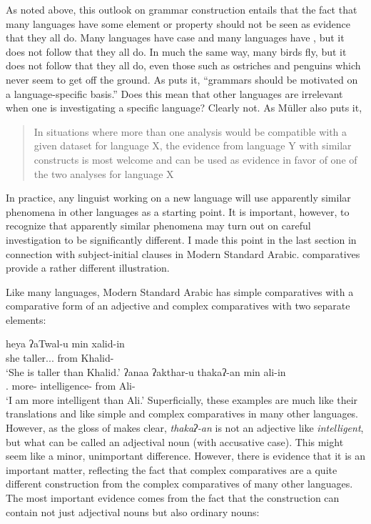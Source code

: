 \documentclass[output=paper]{langsci/langscibook}
\begin{document}
As noted above, this outlook on grammar construction entails that the fact that
many languages have some element or property should not be seen as evidence
that they all do. Many languages have case and many languages have
, but it does not follow that they all do. In much the same way,
many birds fly, but it does not follow that they all do, even those such as
ostriches and penguins which never seem to get off the ground. As
\citet[25]{Muller2015} puts it, \enquote{grammars should be motivated on a
    language-specific basis.} Does this mean that other languages are
    irrelevant when one is investigating a specific language?  Clearly not. As
    Müller also puts it, \blockquote[{\citealt[43]{Muller2015}}][.]{In
        situations where more than one analysis would be compatible with a
    given dataset for language X, the evidence from language Y with similar
constructs is most welcome and can be used as evidence in favor of one of the
two analyses for language X} In practice, any linguist working on a new
language will use apparently similar phenomena in other languages as a starting
point. It is important, however, to recognize that apparently similar phenomena
may turn out on careful investigation to be significantly different. I made
this point in the last section in connection with subject-initial clauses in
Modern Standard Arabic.   comparatives provide a rather different
illustration.

Like many languages, Modern Standard Arabic has simple comparatives with a comparative form of an
adjective and complex comparatives with two separate elements:

\newpage

\ea\label{ex:key:4.34}
    \ea\label{ex:key:4.34a}
        \gll    heya    ʔaTwal-u           min    xalid-in\\
                she taller.\F.\Sg.\Nom{} from Khalid-\Gen{}\\
        \glt    \enquote*{She is taller than Khalid.}
    \ex\label{ex:key:4.34b}
        \gll    ʔanaa        ʔakthar-u    thakaʔ-an          min    ali-in\\
                \Fsg.\M{} more-\Nom{} intelligence-\Acc{} from Ali-\Gen{}\\
        \glt    \enquote*{I am more intelligent than Ali.}
    \z
\z
%
Superficially, these examples are much like their  translations
and like simple and complex comparatives in many other languages. However, as
the gloss of  makes clear, \emph{thakaʔ-an} is not an
adjective like \emph{intelligent}, but what can be called an adjectival noun
(with accusative case). This might seem like a minor, unimportant difference.
However, there is evidence that it is an important matter, reflecting the fact
that  complex comparatives are a quite different construction from
the complex comparatives of many other languages. The most important evidence
comes from the fact that the construction can contain not just adjectival nouns
but also ordinary nouns:
\end{document}

